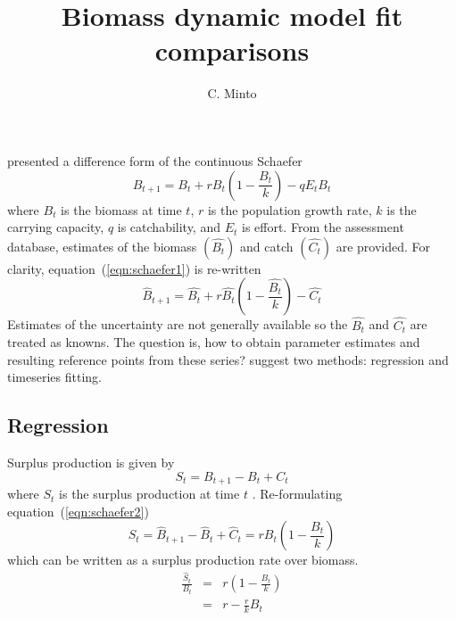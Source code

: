 \documentclass[12pt]{proc}
\author{C. Minto}
\title{Biomass dynamic model fit comparisons}
\date{}
\begin{document}
\maketitle
\citet{WaltersHilborn1976} presented a difference form of the continuous Schaefer
\begin{equation}
B_{t+1}=B_{t}+rB_{t}\left( 1-\frac{B_{t}}{k}\right)-qE_{t}B_{t}
\label{eqn:schaefer1}
\end{equation}
where $B_t$ is the biomass at time $t$, $r$ is the population growth rate, $k$ is the carrying capacity, $q$ is catchability, and $E_{t}$ is effort. From the assessment database, estimates of the biomass $(\hat{B_{t}})$ and catch $(\hat{C_{t}})$ are provided. For clarity, equation~(\ref{eqn:schaefer1}) is re-written  
\begin{equation}
 \hat{B}_{t+1}=\hat{B_{t}}+r\hat{B_{t}}\left( 1-\frac{\hat{B_{t}}}{k}\right)-\hat{C_{t}}
\label{eqn:schaefer2}
\end{equation}
Estimates of the uncertainty are not generally available so the $\hat{B_t}$ and $\hat{C_t}$ are treated as knowns. The question is, how to obtain parameter estimates and resulting reference points from these series? \citet{WaltersHilborn1991} suggest two methods: regression and timeseries fitting.
\subsection{Regression}
Surplus production is given by
\begin{equation}
 S_{t}=B_{t+1}-B_{t}+C_{t}
\end{equation}
where $S_{t}$ is the surplus production at time $t$ \citep{Hilborn2001}. Re-formulating equation~(\ref{eqn:schaefer2})
\begin{equation}
\hat{S}_{t}=\hat{B}_{t+1}-\hat{B}_{t}+\hat{C}_{t}=rB_{t}\left( 1-\frac{B_{t}}{k}\right)
\end{equation}
which can be written as a surplus production rate over biomass.
\begin{eqnarray}
\frac{\hat{S}_{t}}{B_{t}}&=&r\left( 1-\frac{B_{t}}{k}\right)\\
&=&r-\frac{r}{k} B_{t}
\end{eqnarray}


\end{document}
